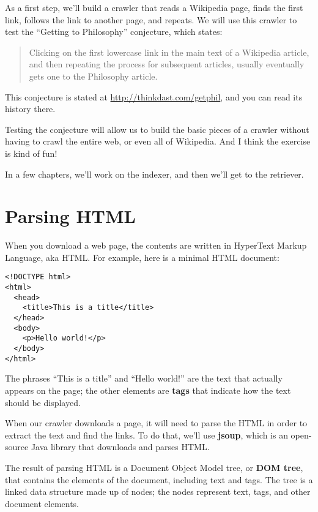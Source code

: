 \documentclass[12pt]{book}
\theoremstyle{exercise}
\begin{document}

As a first step, we'll build a crawler that reads a Wikipedia page,
finds the first link, follows the link to another page, and repeats. We
will use this crawler to test the ``Getting to Philosophy'' conjecture,
which states:

\begin{quote}
Clicking on the first lowercase link in the main text of a
Wikipedia article, and then repeating the process for subsequent
articles, usually eventually gets one to the Philosophy article.
\end{quote}

This conjecture is stated at
\url{http://thinkdast.com/getphil}{},
and you can read its history there.

Testing the conjecture will allow us to build the basic pieces of a
crawler without having to crawl the entire web, or even all of
Wikipedia. And I think the exercise is kind of fun!

In a few chapters, we'll work on the indexer, and then we'll get to the
retriever.

\section{Parsing HTML}
\label{parsing-html}

When you download a web page, the contents are written in
HyperText Markup Language, aka HTML.
For example, here is a minimal HTML document:

\begin{verbatim}
<!DOCTYPE html>
<html>
  <head>
    <title>This is a title</title>
  </head>
  <body>
    <p>Hello world!</p>
  </body>
</html>
\end{verbatim}

The phrases ``This is a title'' and ``Hello world!'' are the text that
actually appears on the page; the other elements are \textbf{tags} that
indicate how the text should be displayed.


When our crawler downloads a page, it will need to parse the HTML in
order to extract the text and find the links. To do that, we'll use
\textbf{jsoup}, which is an open-source Java library that downloads and
parses HTML.


The result of parsing HTML is a Document Object Model tree, or
\textbf{DOM tree}, that contains the elements of the document, including
text and tags. The tree is a linked data structure made up of nodes; the
nodes represent text, tags, and other document elements.
\end{document}

